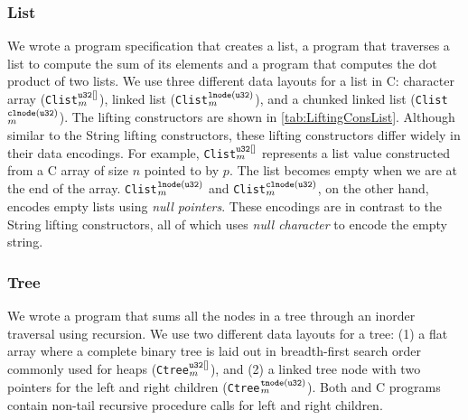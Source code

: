 

\subsubsection{List} We wrote a \SpecL{} program specification that creates a list, a
program that traverses a list to compute the sum of its elements and a program
that computes the dot product of two lists. We use three different
data layouts for a list in C: character array ({\tt Clist}$_m^{\tt u32[]}$),
linked list ({\tt Clist}$_m^{\tt lnode(u32)}$), and
a chunked linked list ({\tt Clist}$_m^{\tt clnode(u32)}$).
The lifting constructors are shown in \cref{tab:LiftingConsList}.
Although similar to the String lifting constructors, these lifting
constructors differ widely in their data encodings. For example,
{\tt Clist}$_m^{\tt u32[]}$ represents a list value constructed
from a C array of size $n$ pointed to by $p$. The list becomes empty
when we are at the end of the array. {\tt Clist}$_m^{\tt lnode(u32)}$
and {\tt Clist}$_m^{\tt clnode(u32)}$, on the other hand, encodes empty
lists using {\em null pointers}. These encodings are in contrast to the
String lifting constructors, all of which uses {\em null character} to
encode the empty string.



\subsubsection{Tree} We wrote a \SpecL{} program that sums all the nodes in a tree
through an inorder traversal using recursion. We use two different data layouts for a tree: 
(1) a flat array where a
complete binary tree is laid out in breadth-first search order commonly used for heaps ({\tt Ctree}$_m^{\tt u32[]}$),
and (2) a linked tree node with two pointers for the left and right children ({\tt Ctree}$_m^{\tt tnode(u32)}$).
Both \SpecL{} and C programs contain non-tail recursive procedure calls for left and right children.



